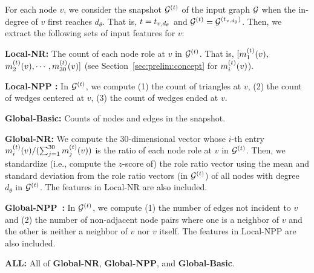 For each node $v$, we consider the snapshot $\mathcal{G}^{(t)}$ of the input graph $\mathcal{G}$ when the in-degree of $v$ first reaches $d_\theta$. That is, $t=t_{v,d_\theta}$ and $\mathcal{G}^{(t)}=\mathcal{G}^{(t_{v,d_\theta})}$.
Then, we extract the following sets of input features for $v$: 
\bit
    \item \textbf{Local-NR:} The count of each node role at $v$ in $\mathcal{G}^{(t)}$. That is, $[m^{(t)}_1(v),$ $m^{(t)}_2(v), \cdots, m^{(t)}_{30}(v)]$ (see Section~\ref{sec:prelim:concept} for $m^{(t)}_i(v)$).
    \item \textbf{Local-NPP \cite{yang2014predicting}:} In $\mathcal{G}^{(t)}$, we compute (1) the count of triangles at $v$, (2) the count of wedges centered at $v$, (3) the count of wedges ended at $v$.
    \item \textbf{Global-Basic:} Counts of nodes and edges in the snapshot.
    \item \textbf{Global-NR:} We compute the $30$-dimensional vector whose $i$-th entry $m^{(t)}_i(v)/(\sum_{j=1}^{30}m^{(t)}_j(v))$
    is the ratio of each node role at $v$ in $\mathcal{G}^{(t)}$.
    Then, we standardize (i.e., compute the $z$-score of) the role ratio vector using the mean and standard deviation from the role ratio vectors (in $\mathcal{G}^{(t)}$) of all nodes with degree $d_\theta$ in $\mathcal{G}^{(t)}$. The features in Local-NR are also included.
    \item \textbf{Global-NPP~\cite{yang2014predicting}:} In $\mathcal{G}^{(t)}$, we compute (1) the number of edges not incident to $v$ and (2) the number of non-adjacent node pairs where one is a neighbor of $v$ and the other is neither a neighbor of $v$ nor $v$ itself.
    The features in Local-NPP are also included.
    \item \textbf{ALL:}  All of \textbf{Global-NR}, \textbf{Global-NPP}, and \textbf{Global-Basic}.
\eit

